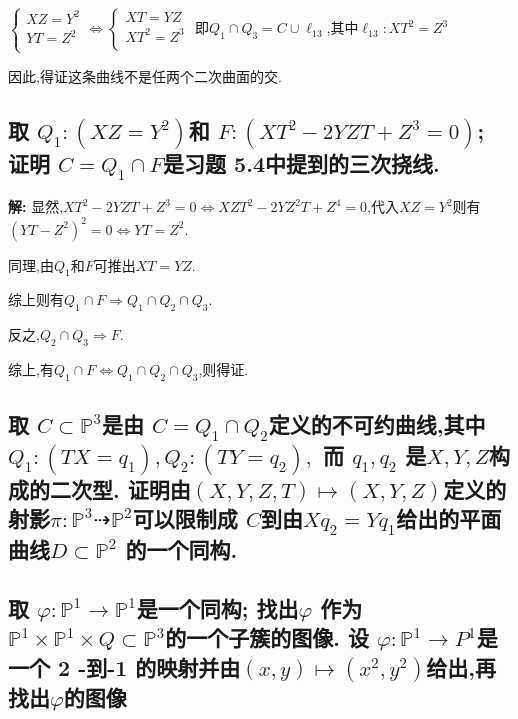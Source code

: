 \documentclass[UTF8]{book}
\begin{document}
		$
		\left\{
		\begin{aligned}
		XZ = Y ^{2} \\
		YT = Z ^{2}\\
		\end{aligned}
		\right.
		\Longleftrightarrow
		\left\{
		\begin{aligned}
		XT = YZ \\
		XT^{2} = Z^{3}\\
		\end{aligned}
		\right.
		$
		即$Q _{ 1 } \cap Q _{ 3 }= C \cup \ell_{ 13}$,其中$\ell_{ 13}: XT^{2} = Z^{3}  $
		
		因此,得证这条曲线不是任两个二次曲面的交.
	
		\subsection{取 $Q_{1}:\left(X Z=Y^{2}\right)$和 $F:\left(X T^{2}-2 Y Z T+Z^{3}=0\right)$; 证明 $C=Q_{1} \cap F$是习题 5.4中提到的三次挠线. }
		
		\textbf{解:}
		显然,$ X T^{2}-2 Y Z T+Z^{3}=0 \Longleftrightarrow XZT^{2}-2 Y Z^{2} T+Z^{4}=0$,代入$ X Z=Y^{2} $则有$ (YT - Z ^{2})^{2} = 0 \Longleftrightarrow YT = Z ^{2} $.
		
		同理,由$ Q_{1} $和$ F $可推出$ XT = YZ $.
		
		综上则有$ Q_{1} \cap F \Longrightarrow  Q_{1} \cap Q_{2} \cap Q_{3}$.
		
		反之,$ Q_{2} \cap Q_{3} \Longrightarrow F$.
		
		综上,有$Q_{1} \cap F \Longleftrightarrow  Q_{1} \cap Q_{2} \cap Q_{3}  $,则得证.
%			
		\subsection{取 $C \subset \mathbb{P} ^{3}$是由 $C = Q _{1} \cap Q _{2}$定义的不可约曲线,其中$Q _{1}:\left( T X = q _{1}\right), Q _{2}:\left( TY = q _{2}\right),$ 而 $q _{1}, q _{2}$ 是$X , Y , Z$构成的二次型. 证明由$( X , Y , Z , T ) \mapsto( X , Y , Z )$定义的射影$\pi: \mathbb{P} ^{3} \dashrightarrow \mathbb{P} ^{2}$可以限制成 $ C $到由$X q_{2}= Yq_{1}$给出的平面曲线$D \subset\mathbb{ P} ^{2}$ 的一个同构.}
	
%			
		\subsection{取 $\varphi: \mathbb{P} ^{1} \rightarrow \mathbb{P} ^{1}$是一个同构; 找出$\varphi$ 作为 $\mathbb{P} ^{1} \times \mathbb{P} ^{1} \times Q \subset \mathbb{P} ^{3}$的一个子簇的图像. 设 $\varphi: \mathbb{P} ^{1} \rightarrow P ^{1}$是一个 2 -到-1 的映射并由$(x, y) \mapsto\left(x^{2}, y^{2}\right)$给出,再找出$\varphi$的图像}
%			
%		
\end{document}
